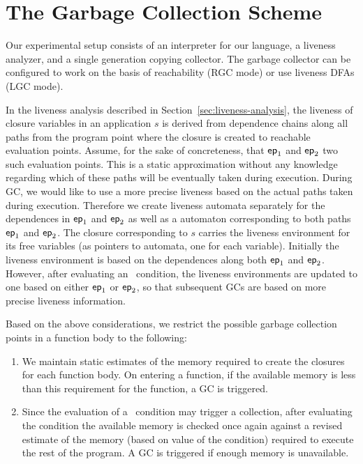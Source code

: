 \documentclass[preprint,9pt]{sigplanconf}
\begin{document}
\section{The Garbage Collection Scheme}
\label{sec:GC-scheme}

Our experimental setup  consists of an interpreter
for  our  language,  a liveness  analyzer,  and  a
single generation copying  collector.  The garbage
collector can be configured to work on the
basis  of  reachability  (RGC  mode)  or  use  
liveness  DFAs  (LGC  mode).  

In        the       liveness        analysis       described        in
Section~\ref{sec:liveness-analysis}, the liveness of closure variables
in  an application  $s$ is  derived from  dependence chains  along all
paths from the program point where the closure is created to reachable
evaluation  points.  Assume,  for   the  sake  of  concreteness,  that
$\mathsf{ep}_1$  and $\mathsf{ep}_2$  two  such evaluation  points.   This is  a
static approximation  without any  knowledge regarding which  of these
paths will be  eventually taken during execution. During  GC, we would
like to use a more precise  liveness based on the  actual
paths  taken  during  execution.    Therefore we create  liveness  automata
separately  for the dependences in   $\mathsf{ep}_1$ and  $\mathsf{ep}_2$  as  well as  a  automaton
corresponding to  both paths  $\mathsf{ep}_1$ and $\mathsf{ep}_2$.   The closure
corresponding to  $s$ carries  the liveness  environment for  its free
variables (as pointers to automata, one for each variable).  Initially
the  liveness  environment is  based  on  the dependences  along  both
$\mathsf{ep}_1$    and   $\mathsf{ep}_2$.    However,   after    evaluating   an
\SIF\ condition, the liveness environments are updated to one based on
either $\mathsf{ep}_1$ or  $\mathsf{ep}_2$, so that subsequent GCs  are based on
more precise liveness information. 

Based on  the above considerations,  we restrict the  possible garbage
collection points in a function body to the following:
\begin{enumerate}
\item We  maintain static estimates  of the memory required  to create
  the closures for each function body.  On entering a function, if the
  available memory is  less than this requirement for  the function, a
  GC is triggered.
\item Since the evaluation of a  \SIF\ condition may trigger a 
  collection, after evaluating the condition   the available memory
  is  checked once  again against  a  revised estimate  of the  memory
  (based on  value of the condition)  required to execute the  rest of
  the program.  A GC is triggered if enough memory is unavailable.
\end{enumerate}
\end{document}
